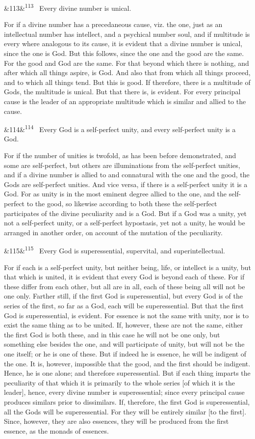 \documentclass[12pt]{article}
\newcommand{\para}[1][]{\par\noindent\ifx&#1&\else\textsuperscript{\footnotesize #1}~\fi}
\begin{document}
\para[113] Every divine number is unical.

For if a divine number has a precedaneous cause, viz. the one, just as an intellectual number has intellect, and a psychical number soul, and if multitude is every where analogous to its cause, it is evident that a divine number is unical, since the one is God. But this follows, since the one and the good are the same. For the good and God are the same. For that beyond which there is nothing, and after which all things aspire, is God. And also that from which all things proceed, and to which all things tend. But this is good. If therefore, there is a multitude of Gods, the multitude is unical. But that there is, is evident. For every principal cause is the leader of an appropriate multitude which is similar and allied to the cause.

\para[114] Every God is a self-perfect unity, and every self-perfect unity is a God.

For if the number of unities is twofold, as has been before demonstrated, and some are self-perfect, but others are illuminations from the self-perfect unities, and if a divine number is allied to and connatural with the one and the good, the Gods are self-perfect unities. And vice versa, if there is a self-perfect unity it is a God. For as unity is in the most eminent degree allied to the one, and the self-perfect to the good, so likewise according to both these the self-perfect participates of the divine peculiarity and is a God. But if a God was a unity, yet not a self-perfect unity, or a self-perfect hypostasis, yet not a unity, he would be arranged in another order, on account of the mutation of the peculiarity.

\para[115] Every God is superessential, supervital, and superintellectual.

For if each is a self-perfect unity, but neither being, life, or intellect is a unity, but that which is united, it is evident that every God is beyond each of these. For if these differ from each other, but all are in all, each of these being all will not be one only. Farther still, if the first God is superessential, but every God is of the series of the first, so far as a God, each will be superessential. But that the first God is superessential, is evident. For essence is not the same with unity, nor is to exist the same thing as to be united. If, however, these are not the same, either the first God is both these, and in this case he will not be one only, but something else besides the one, and will participate of unity, but will not be the one itself; or he is one of these. But if indeed he is essence, he will be indigent of the one. It is, however, impossible that the good, and the first should be indigent. Hence, he is one alone; and therefore superessential. But if each thing imparts the peculiarity of that which it is primarily to the whole series [of which it is the leader], hence, every divine number is superessential; since every principal cause produces similars prior to dissimilars. If, therefore, the first God is superessential, all the Gods will be superessential. For they will be entirely similar [to the first]. Since, however, they are also essences, they will be produced from the first essence, as the monads of essences.
\end{document}
